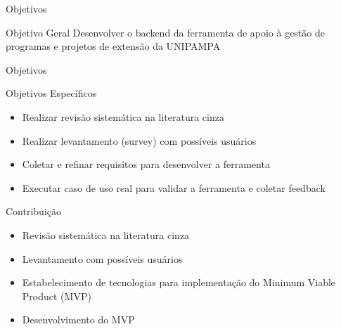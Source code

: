 \begin{frame}{{\sffamily Objetivos}}
\begin{block}{Objetivo Geral}
Desenvolver o backend da ferramenta de apoio à gestão de programas e projetos de extensão da UNIPAMPA
\end{block}
\end{frame}

\begin{frame}{{\sffamily Objetivos}}
\begin{block}{Objetivos Específicos}
\begin{itemize}%
		\item Realizar revisão sistemática na literatura cinza
		\item Realizar levantamento (survey) com possíveis usuários
		\item Coletar e refinar requisitos para desenvolver a ferramenta
		\item Executar caso de uso real para validar a ferramenta e coletar feedback
    \end{itemize}
\end{block}
\end{frame}

\begin{frame}{{\sffamily Contribuição}}
\begin{block}{}
\begin{itemize}%
		\item Revisão sistemática na literatura cinza
		\item Levantamento com possíveis usuários
		\item Estabelecimento de tecnologias para
implementação do Minimum Viable Product (MVP)
        \item Desenvolvimento do MVP
    \end{itemize}
\end{block}
\end{frame}
